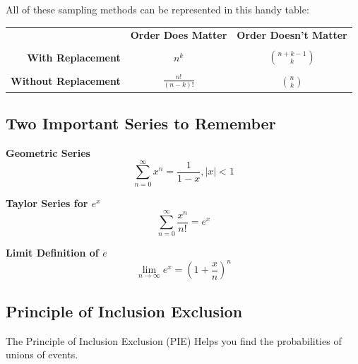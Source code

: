 \documentclass[10pt]{article}
\theoremstyle{definition}
\theoremstyle{remark}
\begin{document}
\bigskip

\noindent
All of these sampling methods can be represented in this handy table:

\begin{table}[H]
		\begin{center}
	    	    \setlength{\extrarowheight}{1pt}
			\begin{tabular}{r|cc}
				 & \textbf{Order Does Matter} & \textbf{Order Doesn't Matter} \\ \\ \hline
				\textbf{With Replacement} & $\displaystyle n^k$ & $\displaystyle{\binom{n+k-1}{k}}$ \\ \\
				\textbf{Without Replacement} & $\displaystyle\frac{n!}{(n - k)!}$ & $\displaystyle{\binom{n}{k}}$
			\end{tabular}
		\end{center}
		\end{table}

\pagebreak

\subsection{Two Important Series to Remember}
\begin{minipage}{0.45\textwidth}
\textbf{Geometric Series}
\[\sum_{n=0}^\infty x^n = \frac{1}{1 - x}, |x| < 1\]
\end{minipage}
\hfill
\begin{minipage}{0.45\textwidth}
\textbf{Taylor Series for $e^x$}
\[\sum_{n=0}^\infty \frac{x^n}{n!} = e^x\]
\end{minipage}

\bigskip

\noindent \begin{minipage}{0.45\textwidth}
\textbf{Limit Definition of $e$}
\[\lim_{n \to \infty} e^x = \left( 1 + \frac{x}{n} \right)^n \]
\end{minipage}

\subsection{Principle of Inclusion Exclusion}

The Principle of Inclusion Exclusion (PIE) Helps you find the probabilities of unions of events. 
\end{document}
